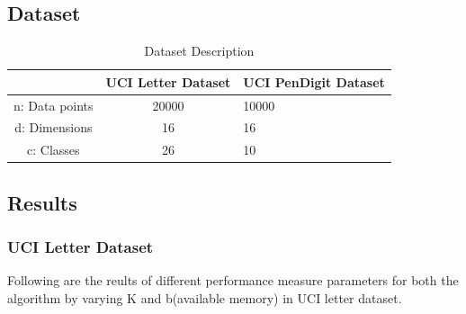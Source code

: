 \subsection{Dataset}
\begin{table}[H]
	\centering
	\caption{Dataset Description}
	\label{my-label}
	\begin{tabular}{|c|c|l|}
		\hline
		\multicolumn{1}{|l|}{} & UCI Letter Dataset & UCI PenDigit Dataset \\ \hline
		n: Data points         & 20000              & 10000                \\ \hline
		d: Dimensions          & 16                 & 16                   \\ \hline
		c: Classes             & 26                 & 10                   \\ \hline
	\end{tabular}
\end{table}



\subsection{Results}

\subsubsection{UCI Letter Dataset}

Following are the reults of different performance measure parameters for both the algorithm by varying K and b(available memory) in UCI letter dataset. 



